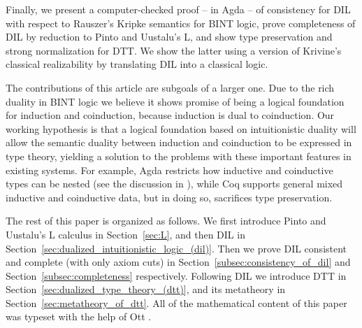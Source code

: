 Finally, we present a computer-checked proof -- in Agda -- of
consistency for DIL with respect to Rauszer's Kripke semantics for
BINT logic, prove completeness of DIL by reduction to Pinto and
Uustalu's L, and show type preservation and strong normalization for
DTT.  We show the latter using a version of Krivine's classical
realizability by translating DIL into a classical logic.

The contributions of this article are subgoals of a larger one.  Due
to the rich duality in BINT logic we believe it shows promise of being
a logical foundation for induction and coinduction, because induction
is dual to coinduction. Our working hypothesis is that a logical
foundation based on intuitionistic duality will allow the semantic
duality between induction and coinduction to be expressed in type
theory, yielding a solution to the problems with these important
features in existing systems.  For example, Agda restricts how
inductive and coinductive types can be nested (see the discussion in
\cite{abel+13}), while Coq supports general mixed inductive and
coinductive data, but in doing so, sacrifices type preservation.

The rest of this paper is organized as follows.  We first introduce
Pinto and Uustalu's L calculus in Section~\ref{sec:L}, and then DIL in
Section~\ref{sec:dualized_intuitionistic_logic_(dil)}. Then we prove
DIL consistent and complete (with only axiom cuts) in
Section~\ref{subsec:consistency_of_dil} and
Section~\ref{subsec:completeness} respectively.  Following DIL we
introduce DTT in Section~\ref{sec:dualized_type_theory_(dtt)}, and its
metatheory in Section~\ref{sec:metatheory_of_dtt}. All of the
mathematical content of this paper was typeset with the help of Ott
\cite{Sewell:2010}.

